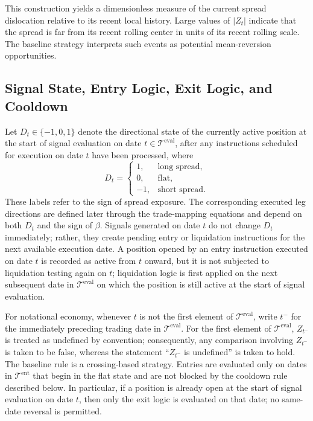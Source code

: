 \documentclass[11pt,a4paper]{article}
\begin{document}
This construction yields a dimensionless measure of the current spread
dislocation relative to its recent local history. Large values of \(|Z_t|\)
indicate that the spread is far from its recent rolling center in units of its
recent rolling scale. The baseline strategy interprets such events as potential
mean-reversion opportunities.

\subsection{Signal State, Entry Logic, Exit Logic, and Cooldown}

Let \(D_t \in \{-1,0,1\}\) denote the directional state of the currently active
position at the start of signal evaluation on date
\(t \in \mathcal T^{\mathrm{eval}}\), after any instructions scheduled for
execution on date \(t\) have been processed, where
\[
  D_t =
  \begin{cases}
    1, & \text{long spread},\\
    0, & \text{flat},\\
    -1, & \text{short spread}.
  \end{cases}
\]
These labels refer to the sign of spread exposure. The corresponding executed
leg directions are defined later through the trade-mapping equations and depend
on both \(D_t\) and the sign of \(\beta\). Signals generated on date \(t\) do
not change \(D_t\) immediately; rather, they create pending entry or
liquidation instructions for the next available execution date.
A position opened by an entry instruction executed on date \(t\) is recorded as active from \(t\) onward, but it is not subjected to liquidation testing again on \(t\); liquidation logic is first applied on the next subsequent date in \(\mathcal T^{\mathrm{eval}}\) on which the position is still active at the start of signal evaluation.

For notational economy, whenever \(t\) is not the first element of
\(\mathcal T^{\mathrm{eval}}\), write \(t^{-}\) for the immediately preceding
trading date in \(\mathcal T^{\mathrm{eval}}\). For the first element of
\(\mathcal T^{\mathrm{eval}}\), \(Z_{t^-}\) is treated as undefined by
convention; consequently, any comparison involving \(Z_{t^-}\) is taken to be
false, whereas the statement ``\(Z_{t^-}\) is undefined'' is taken to hold.
The baseline rule is a crossing-based strategy. Entries are evaluated only on
dates in \(\mathcal T^{\mathrm{ent}}\) that begin in the flat state and are
not blocked by the cooldown rule described below. In particular, if a position
is already open at the start of signal evaluation on date \(t\), then only the
exit logic is evaluated on that date; no same-date reversal is permitted.
\end{document}
